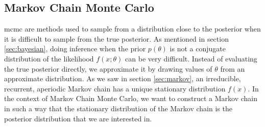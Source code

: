 \documentclass{article}
\theoremstyle{definition}
\begin{document}
\subsection{Markov Chain Monte Carlo}
\gls{mcmc} are  methods used to sample from a distribution close to the posterior when it is difficult to sample from the true posterior. As mentioned in section \ref{sec:bayesian}, 
doing inference when the prior $p\left(\theta\right)$ is not a conjugate distribution of the likelihood $f\left(x ; \theta\right)$ can be very difficult.
Instead of evaluating the true posterior directly, we approximate it by drawing values of $\theta$ from an approximate distribution. 
As we saw in  section \ref{sec:markov}, an irreducible, recurrent, aperiodic Markov chain has a unique stationary distribution $f(x)$.
In the context of Markov Chain Monte Carlo, we want to construct a Markov chain in such a way that the stationary distribution of the Markov chain is the posterior distribution that we are interested in. 
\end{document}
